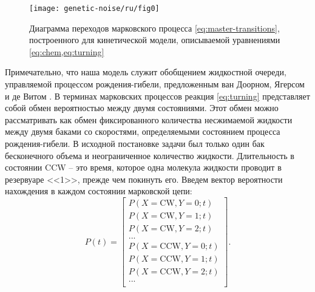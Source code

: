 \begin{figure}[ht]
    \centering
    \texttt{[image: genetic-noise/ru/fig0]}
    \caption{
        Диаграмма переходов марковского процесса \cref{eq:master-transitions}, построенного для кинетической модели, описываемой уравнениями \cref{eq:chem,eq:turning}
    }
    \label{fig:transitions}
\end{figure}

Примечательно, что наша модель служит обобщением жидкостной очереди, управляемой процессом рождения-гибели, предложенным ван Доорном, Ягерсом и де Витом \cite{van_doom_fluid_1988}. В терминах марковских процессов реакция \cref{eq:turning} представляет собой обмен вероятностью между двумя состояниями. Этот обмен можно рассматривать как обмен фиксированного количества несжимаемой жидкости между двумя баками со скоростями, определяемыми состоянием процесса рождения-гибели. В исходной постановке задачи был только один бак бесконечного объема и неограниченное количество жидкости. Длительность в состоянии CCW -- это время, которое одна молекула жидкости проводит в резервуаре <<1>>, прежде чем покинуть его. Введем вектор вероятности нахождения в каждом состоянии марковской цепи: 
\begin{equation}
    P(t) = \begin{bmatrix}
    P(X = \mathrm{CW}, Y = 0; t)\\
    P(X = \mathrm{CW}, Y = 1; t)\\
    P(X = \mathrm{CW}, Y = 2; t)\\
    ...\\
    P(X = \mathrm{CCW}, Y = 0; t)\\
    P(X = \mathrm{CCW}, Y = 1; t)\\
    P(X = \mathrm{CCW}, Y = 2; t)\\
    ...\\
    \end{bmatrix}.
\label{eq:state-probs}
\end{equation}

